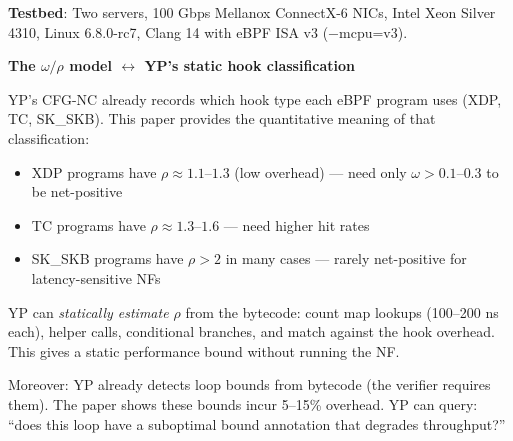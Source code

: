 \textbf{Testbed}: Two servers, 100 Gbps Mellanox ConnectX-6 NICs, Intel Xeon Silver 4310, Linux 6.8.0-rc7, Clang 14 with eBPF ISA v3 ($-$mcpu=v3).

\begin{analogybox}
\textbf{The $\omega/\rho$ model $\leftrightarrow$ YP's static hook classification}

YP's CFG-NC already records which hook type each eBPF program uses (XDP, TC, SK\_SKB). This paper provides the quantitative meaning of that classification:

\begin{itemize}
  \item XDP programs have $\rho \approx 1.1$--$1.3$ (low overhead) --- need only $\omega > 0.1$--$0.3$ to be net-positive
  \item TC programs have $\rho \approx 1.3$--$1.6$ --- need higher hit rates
  \item SK\_SKB programs have $\rho > 2$ in many cases --- rarely net-positive for latency-sensitive NFs
\end{itemize}

YP can \emph{statically estimate $\rho$} from the bytecode: count map lookups (100--200 ns each), helper calls, conditional branches, and match against the hook overhead. This gives a static performance bound without running the NF.

Moreover: YP already detects loop bounds from bytecode (the verifier requires them). The paper shows these bounds incur 5--15\% overhead. YP can query: ``does this loop have a suboptimal bound annotation that degrades throughput?''
\end{analogybox}

